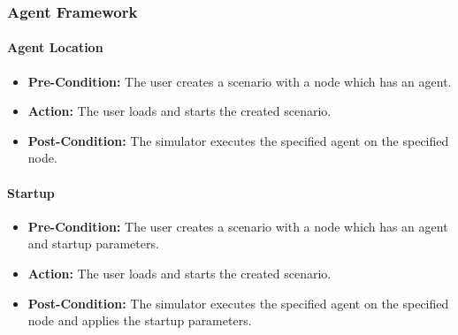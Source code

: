 \documentclass[titlepage]{article}
\newcommand{\testentry}[4]{
    \paragraph{#1}
    \begin{itemize}
        \item \textbf{Pre-Condition:} #2
        \item \textbf{Action:} #3
        \item \textbf{Post-Condition:} #4
    \end{itemize}
}
\begin{document}
\subsubsection{Agent Framework}
    \testentry{Agent Location}{
        The user creates a scenario with a node which has an agent.
    }{
        The user loads and starts the created scenario.
    }{
        The simulator executes the specified agent on the specified node.
    }
    \testentry{Startup}{
        The user creates a scenario with a node which has an agent and startup parameters.
    }{
        The user loads and starts the created scenario.
    }{
        The simulator executes the specified agent on the specified node and applies the startup parameters.
    }

\end{document}
